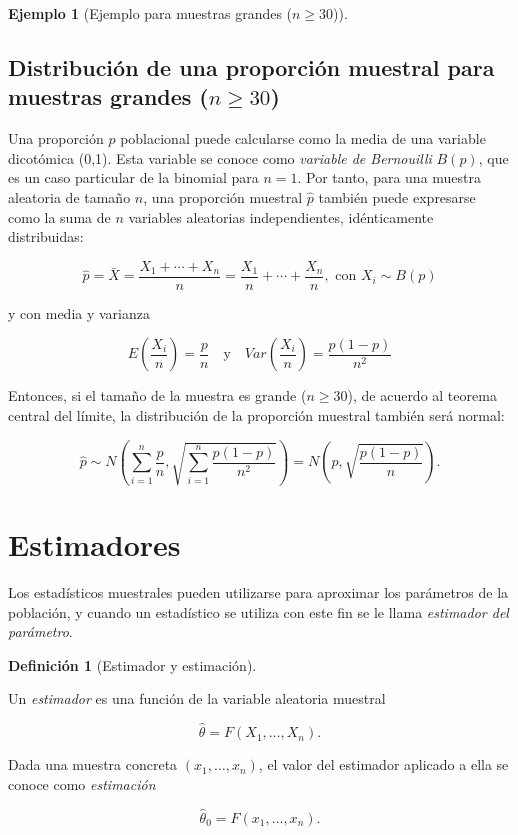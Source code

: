 \documentclass[
  a4paper,
]{scrreport}
\theoremstyle{plain}
\theoremstyle{definition}
\newtheorem{example}{Ejemplo}[chapter]
\theoremstyle{definition}
\newtheorem{definition}{Definición}[chapter]
\theoremstyle{remark}
\begin{document}
\begin{example}[Ejemplo para muestras grandes
(\(n\geq 30\))]
\begin{figure}
{}

\end{figure}

\end{example}

\hypertarget{distribuciuxf3n-de-una-proporciuxf3n-muestral-para-muestras-grandes-ngeq-30}{%
\subsection{\texorpdfstring{Distribución de una proporción muestral para
muestras grandes
(\(n\geq 30\))}{Distribución de una proporción muestral para muestras grandes (n\textbackslash geq 30)}}\label{distribuciuxf3n-de-una-proporciuxf3n-muestral-para-muestras-grandes-ngeq-30}}

Una proporción \(p\) poblacional puede calcularse como la media de una
variable dicotómica (0,1). Esta variable se conoce como \emph{variable
de Bernouilli} \(B(p)\), que es un caso particular de la binomial para
\(n=1\). Por tanto, para una muestra aleatoria de tamaño \(n\), una
proporción muestral \(\hat p\) también puede expresarse como la suma de
\(n\) variables aleatorias independientes, idénticamente distribuidas:

\[
\hat p = \bar X = \frac{X_1+\cdots+X_n}{n} = \frac{X_1}{n}+\cdots+\frac{X_n}{n}, \mbox{ con } X_i\sim B(p)
\]

y con media y varianza

\[
E\left(\frac{X_i}{n}\right) =\frac{p}{n} \quad  \mbox{y} \quad Var\left(\frac{X_i}{n}\right) = \frac{p(1-p)}{n^2}
\]

Entonces, si el tamaño de la muestra es grande (\(n\geq 30\)), de
acuerdo al teorema central del límite, la distribución de la proporción
muestral también será normal:

\[
\hat p \sim N\left(\sum_{i=1}^n \frac{p}{n},\sqrt{\sum_{i=1}^n \frac{p(1-p)}{n^2}} \right) = N\left(p,\sqrt{\frac{p(1-p)}{n}} \right).
\]

\hypertarget{estimadores}{%
\section{Estimadores}\label{estimadores}}

Los estadísticos muestrales pueden utilizarse para aproximar los
parámetros de la población, y cuando un estadístico se utiliza con este
fin se le llama \emph{estimador del parámetro}.

\begin{definition}[Estimador y
estimación]\protect\hypertarget{def-estimador-estimacion}{}\label{def-estimador-estimacion}

Un \emph{estimador} es una función de la variable aleatoria muestral

\[
\hat \theta = F(X_1,\ldots,X_n).
\]

Dada una muestra concreta \((x_1,\ldots,x_n)\), el valor del estimador
aplicado a ella se conoce como \emph{estimación}

\[
\hat \theta_0 = F(x_1,\ldots,x_n).
\]

\end{definition}
\end{document}
